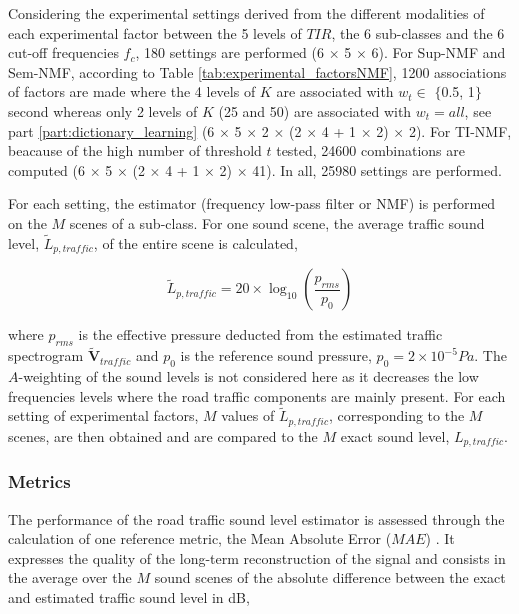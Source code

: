 \documentclass[twocolumn]{svjour3}          %
\begin{document}
Considering the experimental settings derived from the different modalities of each experimental factor  between the 5 levels of $TIR$, the 6 sub-classes and the 6 cut-off frequencies $f_c$, 180 settings are performed (6 $\times$ 5 $\times$ 6). For Sup-NMF and Sem-NMF, according to Table \ref{tab:experimental_factorsNMF},  1200 associations of factors are made where the 4 levels of $K$ are associated with $w_t \in$ $\lbrace$0.5, 1$\rbrace$ second whereas only 2 levels of $K$ (25 and 50) are associated with $w_t = all$, see part \ref{part:dictionary_learning} (6 $\times$ 5 $\times$ 2 $\times$ (2 $\times$ 4 + 1 $\times$ 2) $\times$ 2). For TI-NMF, beacause of the high number of threshold $t$ tested, 24600 combinations are computed (6 $\times$ 5 $\times$ (2 $\times$ 4 + 1 $\times$ 2) $\times$ 41). In all, 25980 settings are performed.

For each setting, the estimator (frequency low-pass filter or NMF) is performed on the $M$ scenes of a sub-class. For one sound scene, the average traffic sound level, $\tilde{L}_{p,traffic}$, of the entire scene is calculated,

\begin{equation}
\tilde{L}_{p,traffic} = 20 \times \log_{10}\left(\frac{p_{rms}}{p_0}\right)
\end{equation}

where $p_{rms}$ is the effective pressure deducted from the estimated traffic spectrogram $\mathbf{\tilde{V}}_{traffic}$ and $p_0$ is the reference sound pressure, $p_0 = 2 \times 10^{-5} Pa$.  The $A$-weighting of the sound levels is not considered here as it decreases the low frequencies levels where the road traffic components are mainly present. For each setting of experimental factors, $M$ values of $\tilde{L}_{p,traffic}$, corresponding to the $M$ scenes, are then obtained and are compared to the $M$ exact sound level, $L_{p,traffic}$.

\subsubsection{Metrics}

The performance of the road traffic sound level estimator is assessed through the calculation of one reference metric, the Mean Absolute Error ($MAE$) \cite{willmott2005advantages}. It expresses the quality of the long-term reconstruction of the signal and consists in the average over the $M$ sound scenes of the absolute difference between the exact and estimated traffic sound level in dB,
\end{document}
